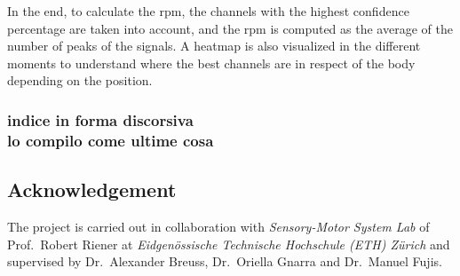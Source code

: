  In the end, to calculate the rpm, the channels with the highest confidence percentage are taken into account, and the rpm is computed as the average of the number of peaks of the signals. A heatmap is also visualized in the different moments to understand where the best channels are in respect of the body depending on the position. 













\subsubsection*{indice in forma discorsiva \\ lo compilo come ultime cosa}

\subsection*{Acknowledgement}
The project is carried out in collaboration with \textit{Sensory-Motor System Lab} of Prof.~Robert Riener at \textit{Eidgenössische Technische Hochschule 
(ETH) Zürich} and supervised by Dr.~Alexander Breuss, Dr.~Oriella Gnarra and Dr.~Manuel Fujis.




